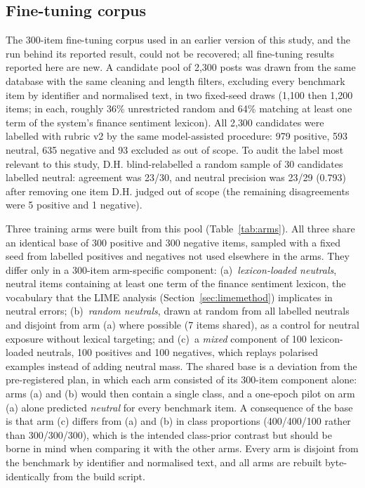 \documentclass{aims}
\numberwithin{equation}{section}
\begin{document}
\subsection{Fine-tuning corpus}\label{sec:ftcorpus}
The 300-item fine-tuning corpus used in an earlier version of this study, and the
run behind its reported result, could not be recovered; all fine-tuning results
reported here are new. A candidate pool of 2{,}300 posts was drawn from the same
database with the same cleaning and length filters, excluding every benchmark item
by identifier and normalised text, in two fixed-seed draws (1{,}100 then 1{,}200
items; in each, roughly 36\% unrestricted random and 64\% matching at least one term
of the system's finance sentiment lexicon). All 2{,}300 candidates were labelled with
rubric v2 by the same model-assisted procedure: 979 positive, 593 neutral, 635
negative and 93 excluded as out of scope. To audit the label most relevant to this
study, D.H. blind-relabelled a random sample of 30 candidates labelled neutral:
agreement was 23/30, and neutral precision was 23/29 (0.793) after removing one item
D.H. judged out of scope (the remaining disagreements were 5 positive and 1
negative).

Three training arms were built from this pool (Table~\ref{tab:arms}). All three share
an identical base of 300 positive and 300 negative items, sampled with a fixed seed
from labelled positives and negatives not used elsewhere in the arms. They differ
only in a 300-item arm-specific component: (a)~\emph{lexicon-loaded neutrals},
neutral items containing at least one term of the finance sentiment lexicon, the
vocabulary that the LIME analysis (Section~\ref{sec:limemethod}) implicates in
neutral errors; (b)~\emph{random neutrals}, drawn at random from all labelled
neutrals and disjoint from arm (a) where possible (7 items shared), as a control for
neutral exposure without lexical targeting; and (c)~a \emph{mixed} component of 100
lexicon-loaded neutrals, 100 positives and 100 negatives, which replays
polarised examples instead of adding neutral mass. The shared base is a deviation from
the pre-registered plan, in which each arm consisted of its 300-item component
alone: arms (a) and (b) would then contain a single class, and a one-epoch pilot on
arm (a) alone predicted \emph{neutral} for every benchmark item. A consequence of
the base is that arm (c) differs from (a) and (b) in class proportions (400/400/100
rather than 300/300/300), which is the intended class-prior contrast but should be
borne in mind when comparing it with the other arms. Every arm is disjoint from the
benchmark by identifier and normalised text, and all arms are rebuilt
byte-identically from the build script.
\end{document}
